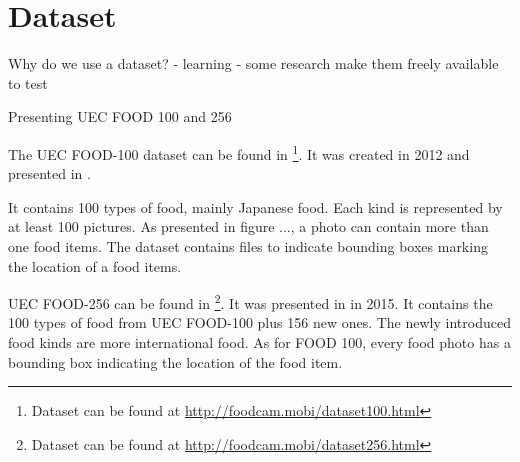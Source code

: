 \chapter{Dataset}

Why do we use a dataset?
- learning
- some research make them freely available to test

Presenting UEC FOOD 100 and 256

The UEC FOOD-100 dataset can be found in \footnote{Dataset can be found at \url{http://foodcam.mobi/dataset100.html}}. It was created in 2012 and presented in \cite{Matsuda2012a}.

It contains 100 types of food, mainly Japanese food. Each kind is represented by at least 100 pictures.
As presented in figure ..., a photo can contain more than one food items. The dataset contains files to indicate bounding boxes marking the location of a food items.

UEC FOOD-256 can be found in \footnote{Dataset can be found at \url{http://foodcam.mobi/dataset256.html}}. It was presented in \cite{Kawano2015} in 2015. It contains  the 100 types of food from UEC FOOD-100 plus 156 new ones. The newly introduced food kinds are more international food. As for FOOD 100, every food photo has a bounding box indicating the location of the food item.